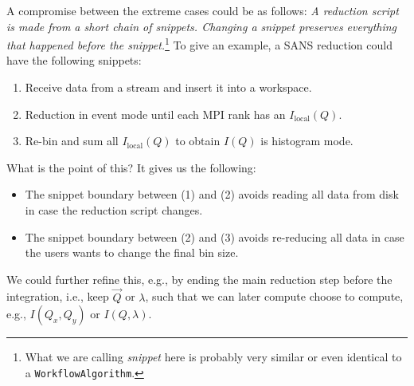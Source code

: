 \documentclass[a4paper,english,numbers=noenddot,bibliography=totoc,chapterprefix=on,DIV=12]{scrartcl}
\begin{document}
A compromise between the extreme cases could be as follows:
\emph{A reduction script is made from a short chain of snippets. Changing a snippet preserves everything that happened before the snippet.}\footnote{What we are calling \emph{snippet} here is probably very similar or even identical to a \texttt{WorkflowAlgorithm}.}
To give an example, a SANS reduction could have the following snippets:
\begin{enumerate}
  \item Receive data from a stream and insert it into a workspace.
  \item Reduction in event mode until each MPI rank has an $I_{\mathrm{local}}(Q)$.
  \item Re-bin and sum all $I_{\mathrm{local}}(Q)$ to obtain $I(Q)$ is histogram mode.
\end{enumerate}
What is the point of this? It gives us the following:
\begin{itemize}
  \item The snippet boundary between (1) and (2) avoids reading all data from disk in case the reduction script changes.
  \item The snippet boundary between (2) and (3) avoids re-reducing all data in case the users wants to change the final bin size.
\end{itemize}
We could further refine this, e.g., by ending the main reduction step before the integration, i.e., keep $\vec Q$ or $\lambda$, such that we can later compute choose to compute, e.g., $I(Q_x,Q_y)$ or $I(Q,\lambda)$.
\end{document}
